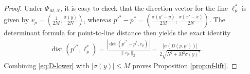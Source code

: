 \documentclass[10pt,a4paper]{amsart}
\newcommand{\dist}{\operatorname{dist}}
\begin{document}
\begin{proof}
Under $\Phi_{M,N}$, it is easy to check that the direction vector for the line $\ell_p^*$ is given by $v_p=\left(\frac1{2M},\frac{\sigma(y)}{2N}\right)$,
whereas $p'^*-p^* =\left( \frac{\sigma(y'-y)}{2M}, \frac{\sigma(x'-x)}{2N}\right)$. The determinant formula for point-to-line distance then yields the exact identity
\begin{equation}
\label{eq:nf-distance-exact}
\begin{aligned}
        \dist(p'^*,\ell_p^*)=\frac{|\det(p'^*-p^*,v_p)|}{\|v_p\|_2}=\frac{|\sigma(D(p,p'))|}
                {2\sqrt{N^2+M^2\sigma(y)^2}}.
\end{aligned}
\end{equation}
Combining \eqref{eq:D-lower} with $|\sigma(y)|\le M$ proves Proposition \ref{prop:nf-lift}.
\end{proof}
\end{document}
